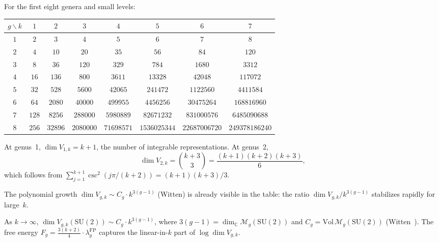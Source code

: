 \begin{computation}\label{comp:verlinde-sl2}
For the first eight genera and small levels:

\medskip
\begin{center}
\renewcommand{\arraystretch}{1.3}
{\small
\begin{tabular}{cccccccc}
\toprule
$g \backslash k$ & $1$ & $2$ & $3$ & $4$ & $5$ & $6$ & $7$ \\
\midrule
$1$ & $2$ & $3$ & $4$ & $5$ & $6$ & $7$ & $8$ \\
$2$ & $4$ & $10$ & $20$ & $35$ & $56$ & $84$ & $120$ \\
$3$ & $8$ & $36$ & $120$ & $329$ & $784$ & $1680$ & $3312$ \\
$4$ & $16$ & $136$ & $800$ & $3611$ & $13328$ & $42048$ & $117072$ \\
$5$ & $32$ & $528$ & $5600$ & $42065$ & $241472$ & $1122560$ & $4411584$ \\
$6$ & $64$ & $2080$ & $40000$ & $499955$ & $4456256$ & $30475264$ & $168816960$ \\
$7$ & $128$ & $8256$ & $288000$ & $5980889$ & $82671232$ & $831000576$ & $6485090688$ \\
$8$ & $256$ & $32896$ & $2080000$ & $71698571$ & $1536025344$ & $22687006720$ & $249378186240$ \\
\bottomrule
\end{tabular}
}
\end{center}
\medskip

At genus~1, $\dim V_{1,k} = k+1$, the number of integrable
representations.  At genus~2,
\[
\dim V_{2,k} = \binom{k+3}{3} = \frac{(k+1)(k+2)(k+3)}{6},
\]
which follows from
$\sum_{j=1}^{k+1} \csc^2(j\pi/(k+2)) = (k+1)(k+3)/3$.

The polynomial growth
$\dim V_{g,k} \sim C_g \cdot k^{3(g-1)}$ \textup{(}Witten\textup{)}
is already visible in the table: the ratio
$\dim V_{g,k}/k^{3(g-1)}$ stabilizes rapidly for large~$k$.
\end{computation}

\begin{remark}\label{rem:verlinde-asymptotics}
As $k \to \infty$, $\dim V_{g,k}(\mathrm{SU}(2)) \sim C_g \cdot k^{3(g-1)}$, where $3(g-1) = \dim_\mathbb{C} \mathcal{M}_g(\mathrm{SU}(2))$ and $C_g = \mathrm{Vol}\,\mathcal{M}_g(\mathrm{SU}(2))$ (Witten~\cite{Witten91}).  The free energy $F_g = \frac{3(k+2)}{4} \cdot \lambda_g^{\mathrm{FP}}$ captures the linear-in-$k$ part of $\log \dim V_{g,k}$.
\end{remark}

